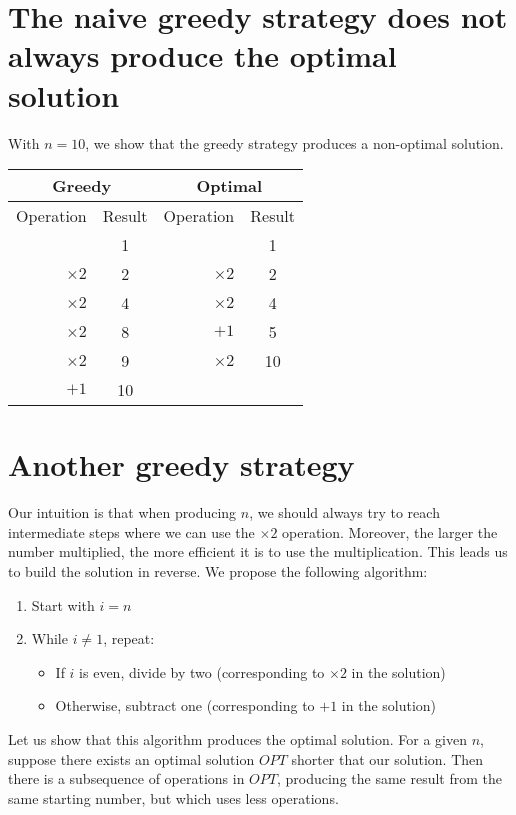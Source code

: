 
\section{The naive greedy strategy does not always produce the optimal solution}

With $n = 10$, we show that the greedy strategy produces a non-optimal solution.

\begin{center}
  \begin{tabular}{|r|cr|c|}
    \hline
    \multicolumn{2}{|c|}{Greedy} & \multicolumn{2}{|c|}{Optimal} \\
    \hline
    Operation & Result & Operation & Result \\
    \hline
               &  1 &            &  1 \\
    $\times 2$ &  2 & $\times 2$ &  2 \\
    $\times 2$ &  4 & $\times 2$ &  4 \\
    $\times 2$ &  8 & $+1$       &  5 \\
    $\times 2$ &  9 & $\times 2$ & 10 \\
    $+1$       & 10 & \multicolumn{2}{c|}{} \\
    \hline
  \end{tabular}
\end{center}

\section{Another greedy strategy}

Our intuition is that when producing $n$, we should always try to reach intermediate steps where we can use the $\times 2$ operation. Moreover, the larger the number multiplied, the more efficient it is to use the multiplication. This leads us to build the solution in reverse. We propose the following algorithm:

\begin{enumerate}
  \item Start with $i = n$
  \item While $i \neq 1$, repeat:
  \begin{itemize}
    \item If $i$ is even, divide by two (corresponding to $\times 2$ in the solution)
    \item Otherwise, subtract one (corresponding to $+1$ in the solution)
  \end{itemize}
\end{enumerate}

Let us show that this algorithm produces the optimal solution. For a given $n$, suppose there exists an optimal solution $OPT$ shorter that our solution. Then there is a subsequence of operations in $OPT$, producing the same result from the same starting number, but which uses less operations.
